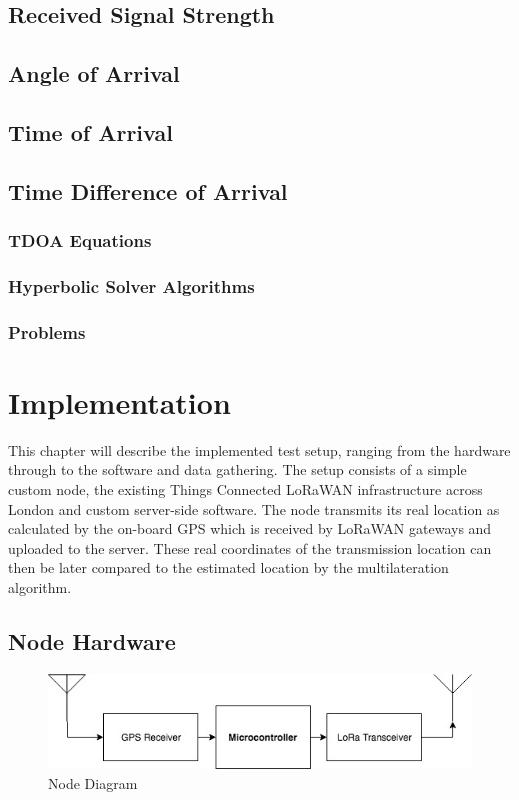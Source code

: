 \documentclass[a4paper]{report}
\begin{document}
  \section{Received Signal Strength}

  \section{Angle of Arrival}

  \section{Time of Arrival}

  \section{Time Difference of Arrival}
    \subsection{TDOA Equations}
    \subsection{Hyperbolic Solver Algorithms}
    \subsection{Problems}

\chapter{Implementation}

  This chapter will describe the implemented test setup, ranging from the hardware through to the software and data gathering. The setup consists of a simple custom node, the existing Things Connected LoRaWAN infrastructure across London and custom server-side software. The node transmits its real location as calculated by the on-board GPS which is received by LoRaWAN gateways and uploaded to the server. These real coordinates of the transmission location can then be later compared to the estimated location by the multilateration algorithm.


  \section{Node Hardware}

    \begin{figure}
    \centering
    \includegraphics[width=12cm]{figures/node.jpeg}
    \caption{Node Diagram}
    \label{fig:node}
    \end{figure}
\end{document}
